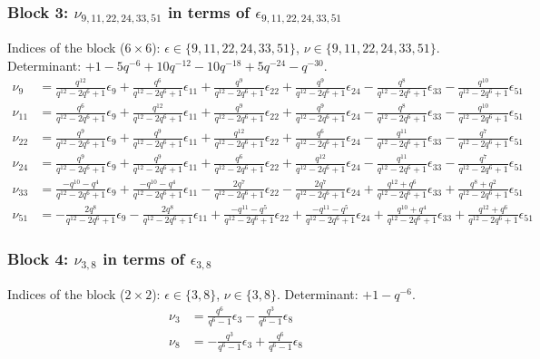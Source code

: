 \subsubsection{Block 3: $\nu_{9, 11, 22, 24, 33, 51}$ in terms of $\epsilon_{9, 11, 22, 24, 33, 51}$}
Indices of the block ($6\times 6$): $\epsilon \in \{9, 11, 22, 24, 33, 51\}$, $\nu \in \{9, 11, 22, 24, 33, 51\}$.
Determinant: $+1-5q^{-6}+10q^{-12}-10q^{-18}+5q^{-24}-q^{-30}$.
\begin{align*}
\nu_{9} &= \frac{q^{12}}{q^{12}-2q^{6}+1}\epsilon_{9} + \frac{q^{6}}{q^{12}-2q^{6}+1}\epsilon_{11} + \frac{q^{9}}{q^{12}-2q^{6}+1}\epsilon_{22} + \frac{q^{9}}{q^{12}-2q^{6}+1}\epsilon_{24} - \frac{q^{8}}{q^{12}-2q^{6}+1}\epsilon_{33} - \frac{q^{10}}{q^{12}-2q^{6}+1}\epsilon_{51}\\
\nu_{11} &= \frac{q^{6}}{q^{12}-2q^{6}+1}\epsilon_{9} + \frac{q^{12}}{q^{12}-2q^{6}+1}\epsilon_{11} + \frac{q^{9}}{q^{12}-2q^{6}+1}\epsilon_{22} + \frac{q^{9}}{q^{12}-2q^{6}+1}\epsilon_{24} - \frac{q^{8}}{q^{12}-2q^{6}+1}\epsilon_{33} - \frac{q^{10}}{q^{12}-2q^{6}+1}\epsilon_{51}\\
\nu_{22} &= \frac{q^{9}}{q^{12}-2q^{6}+1}\epsilon_{9} + \frac{q^{9}}{q^{12}-2q^{6}+1}\epsilon_{11} + \frac{q^{12}}{q^{12}-2q^{6}+1}\epsilon_{22} + \frac{q^{6}}{q^{12}-2q^{6}+1}\epsilon_{24} - \frac{q^{11}}{q^{12}-2q^{6}+1}\epsilon_{33} - \frac{q^{7}}{q^{12}-2q^{6}+1}\epsilon_{51}\\
\nu_{24} &= \frac{q^{9}}{q^{12}-2q^{6}+1}\epsilon_{9} + \frac{q^{9}}{q^{12}-2q^{6}+1}\epsilon_{11} + \frac{q^{6}}{q^{12}-2q^{6}+1}\epsilon_{22} + \frac{q^{12}}{q^{12}-2q^{6}+1}\epsilon_{24} - \frac{q^{11}}{q^{12}-2q^{6}+1}\epsilon_{33} - \frac{q^{7}}{q^{12}-2q^{6}+1}\epsilon_{51}\\
\nu_{33} &= \frac{-q^{10}-q^{4}}{q^{12}-2q^{6}+1}\epsilon_{9} + \frac{-q^{10}-q^{4}}{q^{12}-2q^{6}+1}\epsilon_{11} - \frac{2q^{7}}{q^{12}-2q^{6}+1}\epsilon_{22} - \frac{2q^{7}}{q^{12}-2q^{6}+1}\epsilon_{24} + \frac{q^{12}+q^{6}}{q^{12}-2q^{6}+1}\epsilon_{33} + \frac{q^{8}+q^{2}}{q^{12}-2q^{6}+1}\epsilon_{51}\\
\nu_{51} &= -\frac{2q^{8}}{q^{12}-2q^{6}+1}\epsilon_{9} - \frac{2q^{8}}{q^{12}-2q^{6}+1}\epsilon_{11} + \frac{-q^{11}-q^{5}}{q^{12}-2q^{6}+1}\epsilon_{22} + \frac{-q^{11}-q^{5}}{q^{12}-2q^{6}+1}\epsilon_{24} + \frac{q^{10}+q^{4}}{q^{12}-2q^{6}+1}\epsilon_{33} + \frac{q^{12}+q^{6}}{q^{12}-2q^{6}+1}\epsilon_{51}
\end{align*}

\subsubsection{Block 4: $\nu_{3, 8}$ in terms of $\epsilon_{3, 8}$}
Indices of the block ($2\times 2$): $\epsilon \in \{3, 8\}$, $\nu \in \{3, 8\}$.
Determinant: $+1-q^{-6}$.
\begin{align*}
\nu_{3} &= \frac{q^{6}}{q^{6}-1}\epsilon_{3} - \frac{q^{3}}{q^{6}-1}\epsilon_{8}\\
\nu_{8} &= -\frac{q^{3}}{q^{6}-1}\epsilon_{3} + \frac{q^{6}}{q^{6}-1}\epsilon_{8}
\end{align*}

